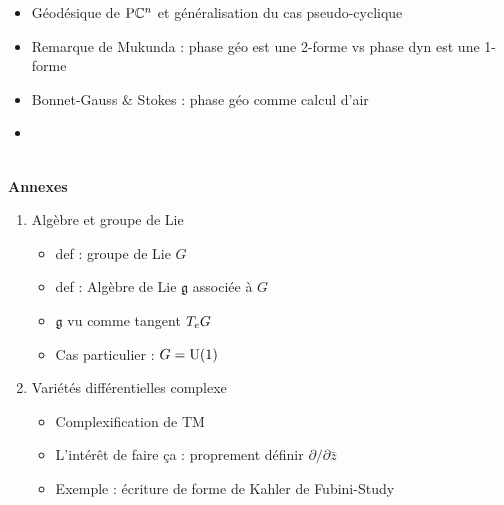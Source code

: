 \begin{enumerate}[label=\Roman* --- ]
\begin{enumerate}[label=\arabic{enumi}.\arabic* --- ]
\begin{itemize}
			\item Géodésique de $\PC{n}$ et généralisation du cas pseudo-cyclique
			
			\item Remarque de Mukunda : phase géo est une 2-forme vs phase dyn est une 1-forme
		
			\item Bonnet-Gauss  \& Stokes : phase géo comme calcul d'air
	
			
			\item {}
		
		\end{itemize}
	\end{enumerate}
\end{enumerate}
\skipl
\\
\textbf{Annexes}
\begin{enumerate}[label=\Alph* --- ] \bfseries
	
	
	\item Algèbre et groupe de Lie
	\begin{itemize}\normalfont
		
		\item def : groupe de Lie $G$
		
		\item def : Algèbre de Lie $\mathfrak{g}$ associée à $G$
		
		\item $\mathfrak{g}$ vu comme tangent $\tg[e]{G}$
		
		\item Cas particulier : $G=\U{1}$
		
	\end{itemize}
	
	\item Variétés différentielles complexe 
	\begin{itemize} \normalfont
		
		\item Complexification de TM
		
		\item L'intérêt de faire ça : proprement définir $\partial/\partial\bar{z}$
		
		\item Exemple : écriture de forme de Kahler de Fubini-Study
		
	\end{itemize}
\end{enumerate}

